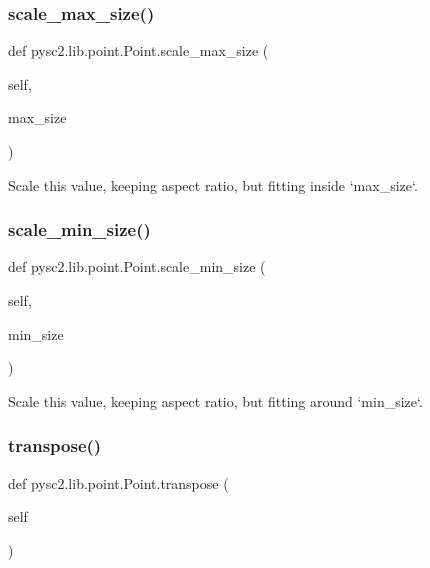 \subsubsection{\texorpdfstring{scale\+\_\+max\+\_\+size()}{scale\_max\_size()}}
{\footnotesize\ttfamily def pysc2.\+lib.\+point.\+Point.\+scale\+\_\+max\+\_\+size (\begin{DoxyParamCaption}\item[{}]{self,  }\item[{}]{max\+\_\+size }\end{DoxyParamCaption})}

\begin{DoxyVerb}Scale this value, keeping aspect ratio, but fitting inside `max_size`.\end{DoxyVerb}
 \mbox{\label{classpysc2_1_1lib_1_1point_1_1_point_a1514760193eeaeb7c741eecf2d5c9b4a}} 
\subsubsection{\texorpdfstring{scale\+\_\+min\+\_\+size()}{scale\_min\_size()}}
{\footnotesize\ttfamily def pysc2.\+lib.\+point.\+Point.\+scale\+\_\+min\+\_\+size (\begin{DoxyParamCaption}\item[{}]{self,  }\item[{}]{min\+\_\+size }\end{DoxyParamCaption})}

\begin{DoxyVerb}Scale this value, keeping aspect ratio, but fitting around `min_size`.\end{DoxyVerb}
 \mbox{\label{classpysc2_1_1lib_1_1point_1_1_point_a828601b4c3d0741500533b686bb5c568}} 
\subsubsection{\texorpdfstring{transpose()}{transpose()}}
{\footnotesize\ttfamily def pysc2.\+lib.\+point.\+Point.\+transpose (\begin{DoxyParamCaption}\item[{}]{self }\end{DoxyParamCaption})}

